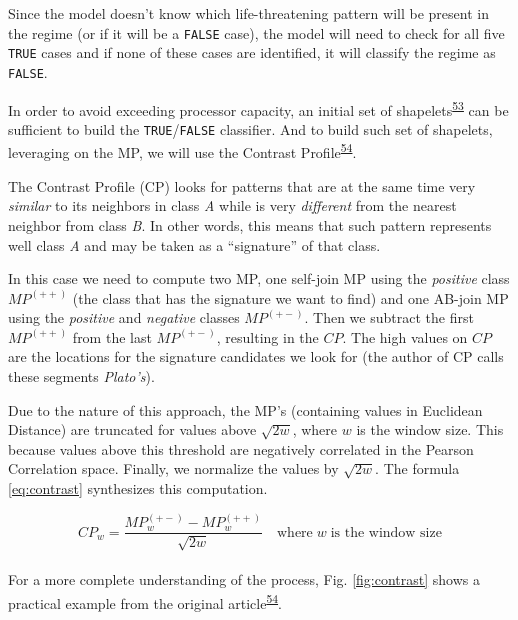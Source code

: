 \documentclass[12pt,twoside]{fmupthesis}
\begin{document}
Since the model doesn't know which life-threatening pattern will be present in the regime (or if it
will be a \texttt{FALSE} case), the model will need to check for all five \texttt{TRUE} cases and if none of these
cases are identified, it will classify the regime as \texttt{FALSE}.

In order to avoid exceeding processor capacity, an initial set of shapelets\textsuperscript{\protect\hyperlink{ref-Rakthanmanon2013}{53}} can
be sufficient to build the \texttt{TRUE}/\texttt{FALSE} classifier. And to build such set of shapelets, leveraging
on the MP, we will use the Contrast Profile\textsuperscript{\protect\hyperlink{ref-Mercer2021}{54}}.

The Contrast Profile (CP) looks for patterns that are at the same time very \emph{similar} to its
neighbors in class \emph{A} while is very \emph{different} from the nearest neighbor from class \emph{B}. In other
words, this means that such pattern represents well class \emph{A} and may be taken as a ``signature'' of
that class.

In this case we need to compute two MP, one self-join MP using the \emph{positive} class \(MP^{(++)}\) (the
class that has the signature we want to find) and one AB-join MP using the \emph{positive} and \emph{negative}
classes \(MP^{(+-)}\). Then we subtract the first \(MP^{(++)}\) from the last \(MP^{(+-)}\), resulting in
the \(CP\). The high values on \(CP\) are the locations for the signature candidates we look for (the
author of CP calls these segments \emph{Plato's}).

Due to the nature of this approach, the MP's (containing values in Euclidean Distance) are truncated
for values above \(\sqrt{2w}\), where \(w\) is the window size. This because values above this threshold
are negatively correlated in the Pearson Correlation space. Finally, we normalize the values by
\(\sqrt{2w}\). The formula \eqref{eq:contrast} synthesizes this computation.

\hfill\break
\begin{equation}
CP_w = \frac{MP_{w}^{(+-)} - MP_{w}^{(++)}}{\sqrt{2w}} \quad \text{where}\; w \; \text{is the window size} \label{eq:contrast}
\end{equation}\\
For a more complete understanding of the process, Fig. \ref{fig:contrast} shows a practical example
from the original article\textsuperscript{\protect\hyperlink{ref-Mercer2021}{54}}.
\end{document}
